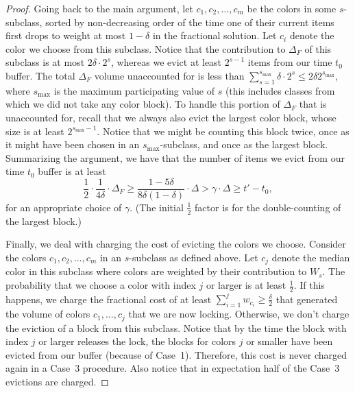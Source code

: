 \documentclass[12pt]{article}
\begin{document}
\begin{proof}
Going back to the main argument, let $c_1,c_2,\dots,c_m$ be
the colors in some $s$-subclass, sorted by non-decreasing 
order of the time one of their current items first drops to weight 
at most $1-\delta$ in the fractional solution. Let $c_i$ denote
the color we choose from this subclass. Notice that the contribution 
to $\Delta_F$ of this subclass is at most $2\delta\cdot 2^s$,
whereas we evict at least $2^{s-1}$ items from our
time $t_0$ buffer. The total $\Delta_F$ volume unaccounted
for is less than $\sum_{s=1}^{s_{\max}} \delta\cdot 2^s\le
2\delta 2^{s_{\max}}$,
where $s_{\max}$ is the maximum participating value of $s$ 
(this includes classes from which we did not take any color
block). To handle this portion of $\Delta_F$ that is unaccounted
for, recall that we always also evict the largest color block,
whose size is at least $2^{s_{\max}-1}$. Notice that we might
be counting this block twice, once as it might have been chosen
in an $s_{\max}$-subclass, and once as the largest block.
Summarizing the argument, we have that the number of items 
we evict from our time $t_0$ buffer is at least 
$$
\frac 1 2\cdot \frac{1}{4\delta}\cdot\Delta_F \ge 
\frac{1-5\delta}{8\delta(1 - \delta)}\cdot\Delta > 
\gamma\cdot\Delta\ge t' - t_0,
$$
for an appropriate choice of $\gamma$. (The initial $\frac 1 2$
factor is for the double-counting of the largest block.)

Finally, we deal with charging the cost of evicting the colors
we choose. Consider the colors $c_1,c_2,\dots,c_m$ in an
$s$-subclass as defined above. Let $c_j$ denote the median
color in this subclass where colors are weighted by their
contribution to $W_s$. The probability that we choose
a color with index $j$ or larger is at least $\frac 1 2$. If
this happens, we charge the fractional cost of at least
$\sum_{i=1}^j w_{c_i}\ge\frac{\delta}{2}$ that generated 
the volume of colors 
$c_1,\dots,c_j$ that we are now locking. Otherwise, we
don't charge the eviction of a block from this subclass.
Notice that
by the time the block with index $j$ or larger releases the
lock, the blocks for colors $j$ or smaller have been evicted
from our buffer (because of Case~1). Therefore, this cost is 
never charged again in a Case~3 procedure. Also notice that
in expectation half of the Case~3 evictions are charged.
\end{proof}
\end{document}
